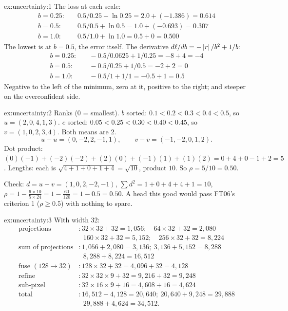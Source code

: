 
\begin{solution}{ex:uncertainty:1}
The loss at each scale:
\begin{align*}
b=0.25:&\quad 0.5/0.25 + \ln 0.25 = 2.0 + (-1.386) = 0.614\\
b=0.5:&\quad 0.5/0.5 + \ln 0.5 = 1.0 + (-0.693) = 0.307\\
b=1.0:&\quad 0.5/1.0 + \ln 1.0 = 0.5 + 0 = 0.500
\end{align*}
The lowest is at $b=0.5$, the error itself. The derivative $d\ell/db=-\left\lvert r \right\rvert/b^2+1/b$:
\begin{align*}
b=0.25:&\quad -0.5/0.0625 + 1/0.25 = -8 + 4 = -4\\
b=0.5:&\quad -0.5/0.25 + 1/0.5 = -2 + 2 = 0\\
b=1.0:&\quad -0.5/1 + 1/1 = -0.5 + 1 = 0.5
\end{align*}
Negative to the left of the minimum, zero at it, positive to the right; and steeper on the overconfident side.
\end{solution}

\begin{solution}{ex:uncertainty:2}
Ranks (0 = smallest). $b$ sorted: $0.1<0.2<0.3<0.4<0.5$, so $u=(2,0,4,1,3)$. $e$ sorted:
$0.05<0.25<0.30<0.40<0.45$, so $v=(1,0,2,3,4)$. Both means are 2.
\[
u-\bar u=(0,-2,2,-1,1),\qquad v-\bar v=(-1,-2,0,1,2).
\]
Dot product: $(0)(-1)+(-2)(-2)+(2)(0)+(-1)(1)+(1)(2) = 0+4+0-1+2 = 5$.
Lengths: each is $\sqrt{4+1+0+1+4}=\sqrt{10}$, product $10$. So $\rho=5/10=0.50$.

Check: $d=u-v=(1,0,2,-2,-1)$, $\sum d^2 = 1+0+4+4+1=10$,
$\rho=1-\frac{6\times10}{5\times24}=1-\frac{60}{120}=1-0.5=0.50$. A head this good would pass FT06's
criterion 1 ($\rho\ge0.5$) with nothing to spare.
\end{solution}

\begin{solution}{ex:uncertainty:3}
With width 32:
\begin{align*}
\text{projections}&: 32\times32+32=1{,}056;\quad 64\times32+32=2{,}080\\
&\phantom{:}\ 160\times32+32=5{,}152;\quad 256\times32+32=8{,}224\\
\text{sum of projections}&: 1{,}056+2{,}080=3{,}136;\ 3{,}136+5{,}152=8{,}288\\
&\phantom{:}\ 8{,}288+8{,}224=16{,}512\\
\text{fuse }(128\to32)&: 128\times32+32=4{,}096+32=4{,}128\\
\text{refine}&: 32\times32\times9+32=9{,}216+32=9{,}248\\
\text{sub-pixel}&: 32\times16\times9+16=4{,}608+16=4{,}624\\
\text{total}&: 16{,}512+4{,}128=20{,}640;\ 20{,}640+9{,}248=29{,}888\\
&\phantom{:}\ 29{,}888+4{,}624=34{,}512.
\end{align*}
\end{solution}

